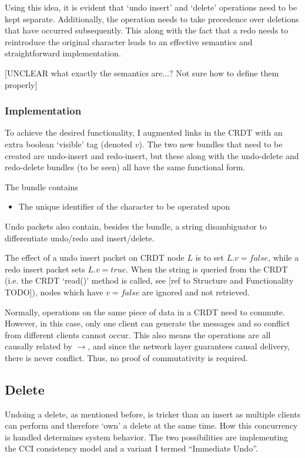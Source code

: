 \documentclass[12pt,a4paper,twoside,openright]{report}
\begin{document}
		Using this idea, it is evident that `undo insert' and `delete' operations need to be kept separate. Additionally, the operation needs to take precedence over deletions that have occurred subsequently. This along with the fact that a redo needs to reintroduce the original character leads to an effective semantics and straightforward implementation.
		
		[UNCLEAR what exactly the semantics are...? Not sure how to define them properly]
		
		\subsubsection{Implementation}
		
		To achieve the desired functionality, I augmented links in the CRDT with an extra boolean `visible' tag (denoted $v$). The two new bundles that need to be created are undo-insert and redo-insert, but these along with the undo-delete and redo-delete bundles (to be seen) all have the same functional form.
		 
		The bundle contains
		\begin{itemize}
			\item The unique identifier of the character to be operated upon
		\end{itemize}
		
		Undo packets also contain, besides the bundle, a string disambiguator to differentiate undo/redo and insert/delete.
		
		The effect of a undo insert packet on CRDT node $L$ is to set $L.v = false$, while a redo insert packet sets $L.v = true$. When the string is queried from the CRDT (i.e. the CRDT `read()' method is called, see [ref to Structure and Functionality TODO]), nodes which have $v = false$ are ignored and not retrieved.
		
		Normally, operations on the same piece of data in a CRDT need to commute. However, in this case, only one client can generate the messages and so conflict from different clients cannot occur. This also means the operations are all causally related by $\rightarrow$, and since the network layer guarantees causal delivery, there is never conflict. Thus, no proof of commutativity is required.
		
	\subsection{Delete}
		Undoing a delete, as mentioned before, is tricker than an insert as multiple clients can perform and therefore `own' a delete at the same time. How this concurrency is handled determines system behavior. The two possibilities are implementing the CCI consistency model and a variant I termed ``Immediate Undo''.
		
\end{document}
